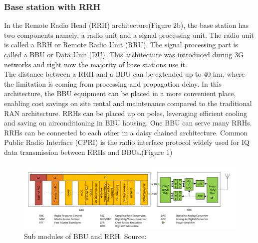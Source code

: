 \documentclass{article}
\begin{document}
\subsubsection{Base station with RRH}


In the Remote Radio Head (RRH) architecture(Figure 2b), the base station 
has two components namely, a radio unit and a signal processing 
unit. The radio unit is called a RRH or Remote Radio Unit (RRU).
The signal processing part is called a BBU or Data Unit (DU). 
This architecture was introduced during 3G networks and right now 
the majority of base stations use it.\\


The distance between a RRH and a BBU can be extended up to 40 km,
where the limitation is coming from processing and propagation delay.
In this architecture, the BBU equipment can be placed in a more 
convenient place, enabling cost savings on site rental and 
maintenance compared to the traditional RAN architecture. 
RRHs can be placed up on poles, leveraging efficient cooling and
saving on airconditioning in BBU housing. One BBU can serve many
RRHs. RRHs can be connected to each other in a daisy chained 
architecture. Common Public Radio Interface (CPRI) is the 
radio interface protocol widely used for IQ data transmission
between RRHs and BBUs.(Figure 1)\nocite{checko14}



\begin{figure}[!h]
  \includegraphics[width=\linewidth]{res/RRH_BBU_CRAN.PNG}
    \caption{Sub modules of BBU and RRH. Source: \parencite{checko14}}
  \label{fig:RRH_BBU_CRAN}
\end{figure}
\end{document}
